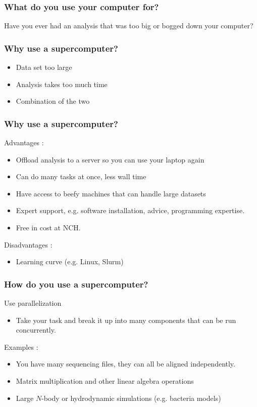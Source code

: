 \documentclass{beamer}
\begin{document}
\begin{frame}
\frametitle{What do you use your computer for?}
Have you ever had an analysis that was too big or bogged down your computer?
\end{frame}


\begin{frame}
\frametitle{Why use a supercomputer?}
\begin{itemize}
    \item Data set too large
    \bigskip
    \pause
    \item Analysis takes too much time
    \bigskip
    \pause
    \item Combination of the two
\end{itemize}
\end{frame}


\begin{frame}
\frametitle{Why use a supercomputer?}
Advantages :
\begin{itemize}
    \pause
    \item Offload analysis to a server so you can use your laptop again
    \medskip
    \pause
    \item Can do many tasks at once, less wall time
    \medskip
    \pause
    \item Have access to beefy machines that can handle large datasets
    \medskip
    \pause
    \item Expert support, e.g. software installation, advice, programming expertise.
    \medskip
    \pause
    \item Free in cost at NCH.
    \pause
\end{itemize}
\bigskip
Disadvantages :
\begin{itemize}
    \pause
    \item Learning curve (e.g. Linux, Slurm)
\end{itemize}
\end{frame}


\begin{frame}
\frametitle{How do you use a supercomputer?}
Use parallelization 
\pause
\begin{itemize}
    \item Take your task and break it up into many components that can be run concurrently.
\bigskip
\end{itemize}
\pause

Examples :
\pause
\begin{itemize}
    \item You have many sequencing files, they can all be aligned independently.
    \medskip
    \pause
    \item Matrix multiplication and other linear algebra operations   %
    \medskip
    \pause
    \item Large $N$-body or hydrodynamic simulations (e.g. bacteria models)      %
\end{itemize}
\end{frame}
\end{document}
